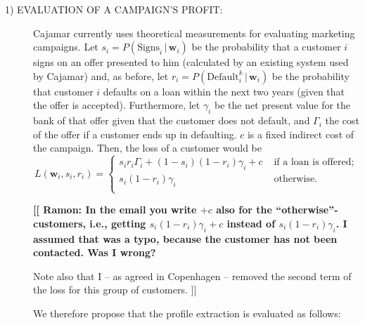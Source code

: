 \documentclass{article}
\theoremstyle{theorem}
\theoremstyle{definition}
\newcommand{\w}{\mathbf{w}}
\newcommand{\comment}[1]{ \begin{center}{\bf [[ #1 ]]}\end{center}}
\begin{document}
\begin{description}
\item [1) EVALUATION OF A CAMPAIGN'S PROFIT:]

Cajamar currently uses theoretical measurements for evaluating marketing campaigns. Let $s_i=P(\mbox{Signs}_i \,|\, \w_i)$ be the probability that a customer $i$ signs on an offer presented to him (calculated by an existing system used by Cajamar) and, as before, let $r_i=P(\mbox{Default}_i^k \,|\, \w_i)$ be the probability that customer $i$ defaults on a loan within the next two years (given that the offer is accepted). Furthermore, let $\gamma_i$ be the net present value for the bank of that offer given that the customer does not default, and  $\Gamma_i$ the cost of the offer if a customer ends up in defaulting. $c$ is a fixed indirect cost of the campaign. Then, the loss of a customer would be
\begin{equation}
 L(\w_i,s_i,r_i) = \left\{\begin{array}{ll}
 s_i r_i\Gamma_i +   (1-s_i) (1-r_i)\gamma_i + c& \text{ if a loan is offered;} \\
s_i (1-r_i)\gamma_i  & \text{ otherwise.} \\ \end{array}\right.   \label{equ:cajamarTheoretical}
 \end{equation}

\comment{Ramon: In the email you write  $+c$ also for the ``otherwise''-customers, i.e., getting $s_i (1-r_i)\gamma_i +c$ instead of $s_i (1-r_i)\gamma_i$. I assumed that was a typo, because the customer has not been contacted. Was I wrong?

Note also that I -- as agreed in Copenhagen -- removed the second term of the loss for this group of customers.}


We therefore propose that the profile extraction is evaluated as follows:


\end{description}
\end{document}
